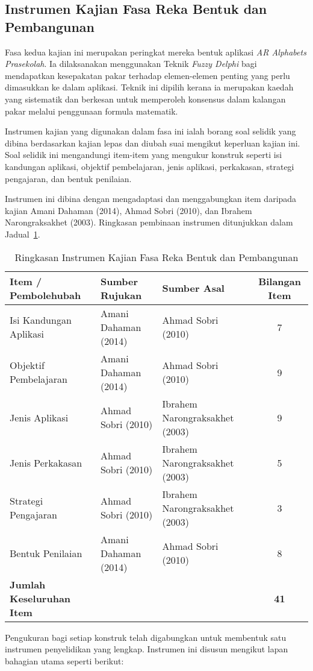 \begin{itemize}
\subsection{Instrumen Kajian Fasa Reka Bentuk dan Pembangunan}

Fasa kedua kajian ini merupakan peringkat mereka bentuk aplikasi \textit{AR Alphabets Prasekolah}. Ia dilaksanakan menggunakan Teknik \textit{Fuzzy Delphi} bagi mendapatkan kesepakatan pakar terhadap elemen-elemen penting yang perlu dimasukkan ke dalam aplikasi. Teknik ini dipilih kerana ia merupakan kaedah yang sistematik dan berkesan untuk memperoleh konsensus dalam kalangan pakar melalui penggunaan formula matematik.

Instrumen kajian yang digunakan dalam fasa ini ialah borang soal selidik yang dibina berdasarkan kajian lepas dan diubah suai mengikut keperluan kajian ini. Soal selidik ini mengandungi item-item yang mengukur konstruk seperti isi kandungan aplikasi, objektif pembelajaran, jenis aplikasi, perkakasan, strategi pengajaran, dan bentuk penilaian.

Instrumen ini dibina dengan mengadaptasi dan menggabungkan item daripada kajian Amani Dahaman (2014), Ahmad Sobri (2010), dan Ibrahem Narongraksakhet (2003). Ringkasan pembinaan instrumen ditunjukkan dalam Jadual~\ref{jadual:instrumenFDM}.
\begin{table}[H]
\centering
\caption{Ringkasan Instrumen Kajian Fasa Reka Bentuk dan Pembangunan}
\label{jadual:instrumenFDM}
\begin{tabular}{|p{5cm}|p{4cm}|p{4cm}|c|}
\hline
\textbf{Item / Pembolehubah} & \textbf{Sumber Rujukan} & \textbf{Sumber Asal} & \textbf{Bilangan Item} \\
\hline
Isi Kandungan Aplikasi & Amani Dahaman (2014) & Ahmad Sobri (2010) & 7 \\
\hline
Objektif Pembelajaran & Amani Dahaman (2014) & Ahmad Sobri (2010) & 9 \\
\hline
Jenis Aplikasi & Ahmad Sobri (2010) & Ibrahem Narongraksakhet (2003) & 9 \\
\hline
Jenis Perkakasan & Ahmad Sobri (2010) & Ibrahem Narongraksakhet (2003) & 5 \\
\hline
Strategi Pengajaran & Ahmad Sobri (2010) & Ibrahem Narongraksakhet (2003) & 3 \\
\hline
Bentuk Penilaian & Amani Dahaman (2014) & Ahmad Sobri (2010) & 8 \\
\hline
\textbf{Jumlah Keseluruhan Item} & & & \textbf{41} \\
\hline
\end{tabular}
\end{table}
Pengukuran bagi setiap konstruk telah digabungkan untuk membentuk satu instrumen penyelidikan yang lengkap. Instrumen ini disusun mengikut lapan bahagian utama seperti berikut:


\end{itemize}
